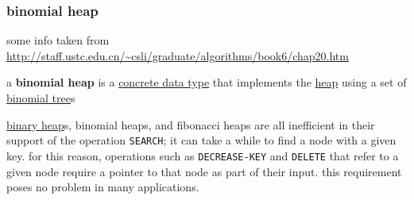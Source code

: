 \documentclass[a4paper,12pt]{article}
\begin{document}
\subsubsection{binomial heap}
\label{sec:orgd6615d4}
some info taken from \url{http://staff.ustc.edu.cn/\~csli/graduate/algorithms/book6/chap20.htm}\\[0pt]
\begin{definition}
a \textbf{binomial heap} is a \hyperref[sec:org39a1299]{concrete data type} that implements the \hyperref[sec:org9903735]{heap} using a set of \hyperref[sec:org6e9f2b7]{binomial tree}s\\[0pt]

\begin{characteristic}
\hyperref[sec:orgff15739]{binary heap}s, binomial heaps, and fibonacci heaps are all inefficient in their support of the operation \texttt{SEARCH}; it can take a while to find a node with a given key. for this reason, operations such as \texttt{DECREASE-KEY} and \texttt{DELETE} that refer to a given node require a pointer to that node as part of their input. this requirement poses no problem in many applications.\\[0pt]
\end{characteristic}
\end{definition}
\end{document}
